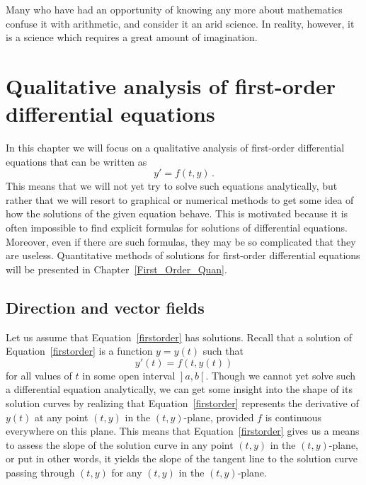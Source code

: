\begin{savequote}[75mm]
Many who have had an opportunity of knowing any more about mathematics confuse it with arithmetic, and consider it an arid science. In reality, however, it is a science which requires a great amount of imagination.
\end{savequote}

\chapter{Qualitative analysis of first-order differential equations}\label{chapqualfirst}
\graphicspath{{figures/QualFirst/}}
In this chapter we will focus on a qualitative analysis of first-order differential equations that can be written as
\begin{equation}
y'=f\left(t,y\right)\,.
\label{firstorder}
\end{equation}
This means that we will not yet try to solve such equations analytically, but rather that we will resort to graphical or numerical methods to get some idea of how the solutions of the given equation behave. This is motivated because it is often impossible to find explicit formulas for solutions of differential equations. Moreover, even if there are such  formulas, they may be so complicated that they are useless. Quantitative methods of solutions for first-order differential equations will be presented in Chapter~\ref{First_Order_Quan}.

\section{Direction and vector fields}
Let us assume that Equation~\eqref{firstorder} has solutions. Recall that a solution of Equation~\eqref{firstorder} is a function $y=y(t)$ such that
$$
y'(t)=f(t,y(t))
$$
for all values of $t$ in some open interval $\left.\right]a,b\left[\right.$. Though we cannot yet solve such a differential equation analytically, we can get some insight into the shape of its solution curves by realizing that Equation~\eqref{firstorder} represents the derivative of $y(t)$ at any point $(t,y)$ in the $(t,y)$-plane, provided $f$ is continuous everywhere on this plane. This means that Equation~\eqref{firstorder} gives us a means to assess the slope of the solution curve in any point  $(t,y)$ in the $(t,y)$-plane, or put in other words, it yields the slope of the tangent line to the solution curve passing through $(t,y)$ for any  $(t,y)$ in the $(t,y)$-plane.

